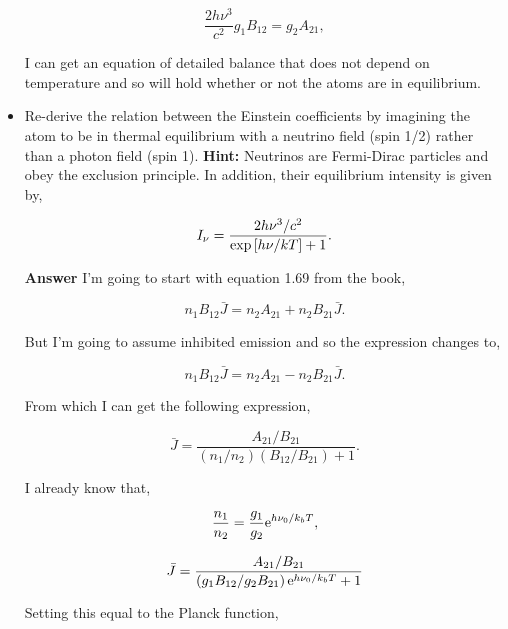 \documentclass[12pt]{article}
\begin{document}
\begin{itemize}
\begin{equation}
\frac{2h\nu^3}{c^2}g_1B_{12} = g_2A_{21},
\end{equation}

\noindent I can get an equation of detailed balance that does not depend on temperature and so will hold whether or not the atoms are in equilibrium.

\item Re-derive the relation between the Einstein coefficients by imagining the atom to be in thermal equilibrium with a neutrino field (spin 1/2) rather than a photon field (spin 1). \textbf{Hint:} Neutrinos are Fermi-Dirac particles and obey the exclusion principle. In addition, their equilibrium intensity is given by,

\begin{equation*}
I_\nu = \frac{2h\nu^3 / c^2}{{\rm exp}\left[h\nu / kT\right] + 1}.
\end{equation*}

\textbf{Answer} I'm going to start with equation 1.69 from the book,

\begin{equation}
n_1B_12\bar{J} = n_2A_{21} + n_2B_{21}\bar{J}.
\end{equation}

\noindent But I'm going to assume inhibited emission and so the expression changes to, 

\begin{equation}
n_1B_12\bar{J} = n_2A_{21} - n_2B_{21}\bar{J}.
\end{equation}

\noindent From which I can get the following expression, 

\begin{equation}
\bar{J} = \frac{A_{21}/B_{21}}{\left(n_1/n_2\right)\left(B_{12}/B_{21}\right) + 1}.
\end{equation}

\noindent I already know that,

\begin{equation}
\frac{n_1}{n_2} = \frac{g_1}{g_2}{\rm e}^{h\nu_0/k_bT},
\end{equation}

\begin{equation}
\bar{J} = \frac{A_{21}/B_{21}}{\left(g_1B_{12}/g_2B_{21}\right){\rm e}^{h\nu_0/k_bT} + 1}
\end{equation}

\noindent Setting this equal to the Planck function, 


\end{itemize}
\end{document}
